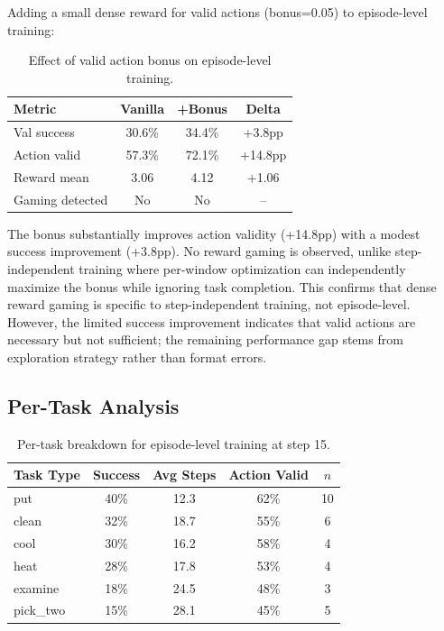 \documentclass[11pt]{article}
\begin{document}
Adding a small dense reward for valid actions (bonus=0.05) to episode-level training:

\begin{table}[h]
\centering
\caption{Effect of valid action bonus on episode-level training.}
\label{tab:bonus}
\begin{tabular}{lccc}
\toprule
Metric & Vanilla & +Bonus & Delta \\
\midrule
Val success & 30.6\% & 34.4\% & +3.8pp \\
Action valid & 57.3\% & 72.1\% & +14.8pp \\
Reward mean & 3.06 & 4.12 & +1.06 \\
Gaming detected & No & No & -- \\
\bottomrule
\end{tabular}
\end{table}

The bonus substantially improves action validity (+14.8pp) with a modest success improvement (+3.8pp). No reward gaming is observed, unlike step-independent training where per-window optimization can independently maximize the bonus while ignoring task completion. This confirms that dense reward gaming is specific to step-independent training, not episode-level. However, the limited success improvement indicates that valid actions are necessary but not sufficient; the remaining performance gap stems from exploration strategy rather than format errors.

\subsection{Per-Task Analysis}

\begin{table}[h]
\centering
\caption{Per-task breakdown for episode-level training at step 15.}
\label{tab:pertask}
\begin{tabular}{lcccc}
\toprule
Task Type & Success & Avg Steps & Action Valid & $n$ \\
\midrule
put & 40\% & 12.3 & 62\% & 10 \\
clean & 32\% & 18.7 & 55\% & 6 \\
cool & 30\% & 16.2 & 58\% & 4 \\
heat & 28\% & 17.8 & 53\% & 4 \\
examine & 18\% & 24.5 & 48\% & 3 \\
pick\_two & 15\% & 28.1 & 45\% & 5 \\
\bottomrule
\end{tabular}
\end{table}
\end{document}
